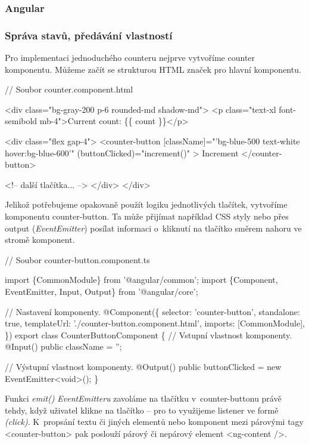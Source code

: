 \subsubsection{Angular}

\subsubsection*{Správa stavů, předávání vlastností}

Pro implementaci jednoduchého counteru nejprve vytvoříme counter komponentu. Můžeme začít se strukturou HTML značek pro hlavní komponentu.

\begin{prog}
// Soubor counter.component.html

<div class="bg-gray-200 p-6 rounded-md shadow-md">
  <p class="text-xl font-semibold mb-4">Current count: \{\{ count \}\}</p>

  <div class="flex gap-4">
    <counter-button
      [className]="'bg-blue-500 text-white hover:bg-blue-600'"
      (buttonClicked)="increment()"
    >
      Increment
    </counter-button>

    <!-- další tlačítka... -->
  </div>
</div>
\end{prog}

Jelikož potřebujeme opakovaně použít logiku jednotlivých tlačítek, vytvoříme komponentu counter-button. 
Ta může přijímat například CSS styly nebo přes output (\emph{EventEmitter}) posílat informaci o~kliknutí na tlačítko směrem nahoru ve stromě komponent.

\begin{prog}
// Soubor counter-button.component.ts

import \{CommonModule\} from '@angular/common';
import \{Component, EventEmitter, Input, Output\} from '@angular/core';

// Nastavení komponenty.
@Component(\{
  selector: 'counter-button',
  standalone: true,
  templateUrl: './counter-button.component.html',
  imports: [CommonModule],
\})
export class CounterButtonComponent \{
  // Vstupní vlastnost komponenty.
  @Input() public className = '';

  // Výstupní vlastnost komponenty.
  @Output() public buttonClicked = new EventEmitter<void>();
\}
\end{prog}

Funkci \emph{emit()} \emph{EventEmitteru} zavoláme na tlačítku v~counter-buttonu právě tehdy, když uživatel klikne na tlačítko -- pro to využijeme listener ve formě \emph{(click)}. 
K~propsání textu či jiných elementů nebo komponent mezi párovými tagy <counter-button> pak poslouží párový či nepárový element <ng-content />.

